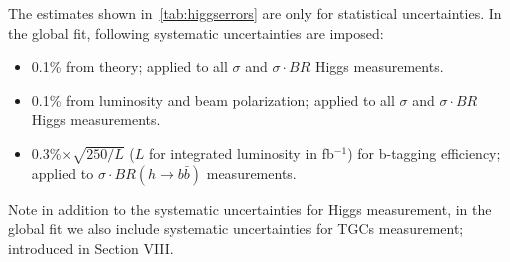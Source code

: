 
The estimates shown in~\ref{tab:higgserrors} are only for statistical uncertainties. In the global fit,
following systematic uncertainties are imposed:
\begin{itemize}
\item 0.1\% from theory; applied to all $\sigma$ and $\sigma\cdot BR$ Higgs measurements.
\item 0.1\% from luminosity and beam polarization; 
applied to all $\sigma$ and $\sigma\cdot BR$ Higgs measurements.
\item 0.3\%$\times\sqrt{250/L}$ ($L$ for integrated luminosity in fb$^{-1}$) for b-tagging efficiency; 
applied to $\sigma\cdot BR(h\to b\bar{b})$ measurements.
\end{itemize}
Note in addition to the systematic uncertainties for Higgs measurement, 
in the global fit we also include systematic 
uncertainties for TGCs measurement; introduced in Section VIII.
